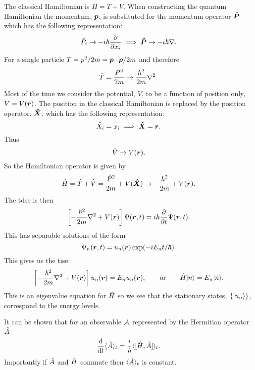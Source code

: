 The classical Hamiltonian is \(H = T + V\).
When constructing the quantum Hamiltonian the momentum, \(\bm{p}\), is substituted for the momentum operator \(\bm{\hat{P}}\) which has the following representation:
\[\hat{P}_i \mathrel{\rightarrow} -i\hbar\pdv{x_i} \implies \bm{\hat{P}} \mathrel{\rightarrow} -i\hbar\nabla.\]
For a single particle \(T = p^2/2m = \bm{p}\cdot\bm{p}/2m\) and therefore
\[\hat{T} = \frac{\hat{P}^2}{2m} \mathrel{\rightarrow} \frac{\hbar^2}{2m}\nabla^2.\]
Most of the time we consider the potential, \(V\), to be a function of position only, \(V = V(\bm{r})\).
The position in the classical Hamiltonian is replaced by the position operator, \(\bm{\hat{X}}\), which has the following representation:
\[\hat{X}_i = x_i \implies \bm{\hat{X}} = \bm{r}.\]
Thus
\[\hat{V} \mathrel{\rightarrow} V(\bm{r}).\]
So the Hamiltonian operator is given by
\[\hat{H} = \hat{T} + \hat{V} = \frac{\hat{P}^2}{2m} + V(\bm{\hat{X}}) \mathrel{\rightarrow} -\frac{\hbar^2}{2m} + V(\bm{r}).\]
The \gls{tdse} is then
\[\left[-\frac{\hbar^2}{2m}\nabla^2 + V(\bm{r})\right]\Psi(\bm{r}, t) = i\hbar\pdv{t}\Psi(\bm{r}, t).\]
This has separable solutions of the form
\[\Psi_n(\bm{r}, t) = u_n(\bm{r})\exp(-iE_nt/\hbar).\]
This gives us the \acrfull{tise}:
\[\left[-\frac{\hbar^2}{2m}\nabla^2 + V(\bm{r})\right]u_n(\bm{r}) = E_nu_n(\bm{r}), \qquad\text{or}\qquad \hat{H}\vert {n} \rangle = E_n\vert {n} \rangle.\]
This is an eigenvalue equation for \(\hat{H}\) so we see that the stationary states, \(\{\vert {u_n} \rangle\}\), correspond to the energy levels.

It can be shown that for an observable \(\mathcal{A}\) represented by the Hermitian operator \(\hat{A}\)
\[\dv{t}\langle{\hat{A}}\rangle_t = \frac{i}{\hbar}\langle{[\hat{H}, \hat{A}]}\rangle_t.\]
Importantly if \(\hat{A}\) and \(\hat{H}\) commute then \(\langle{\hat{A}}\rangle_t\) is constant.

